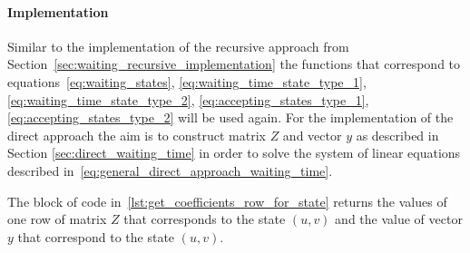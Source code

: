 \paragraph{Implementation}\label{sec:waiting_direct_implementation}

Similar to the implementation of the recursive approach from
Section~\ref{sec:waiting_recursive_implementation} the functions that correspond
to equations~\eqref{eq:waiting_states}, \eqref{eq:waiting_time_state_type_1},
\eqref{eq:waiting_time_state_type_2}, \eqref{eq:accepting_states_type_1},
\eqref{eq:accepting_states_type_2} will be used again.
For the implementation of the direct approach the aim is to construct matrix
\(Z\) and vector \(y\) as described in Section
\ref{sec:direct_waiting_time} in order to solve the system of linear
equations described in~\eqref{eq:general_direct_approach_waiting_time}.

The block of code in~\ref{lst:get_coefficients_row_for_state} returns the
values of one row of matrix \(Z\) that corresponds to the state \((u,v)\) and
the value of vector \(y\) that correspond to the state \((u,v)\).

